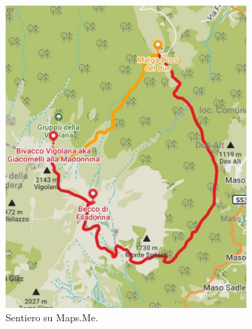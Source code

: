 \documentclass{article}
\begin{document}
\begin{figure}[htbp!]
    \centering
    \begin{subfigure}[t]{0.45\textwidth}
        \centering
        \vspace{0pt} %
        \includegraphics[width=\textwidth]{images/sentiero_mapsMe.jpg}
        \caption{Sentiero su Maps.Me.}
        \label{fig:foto_lunga}
    \end{subfigure}
    \hfill
    \begin{subfigure}[t]{0.45\textwidth}
        \centering
        \vspace{0pt} %

\end{subfigure}
\end{figure}
\end{document}
